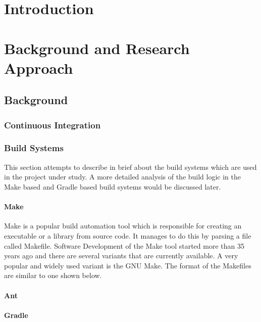 \documentclass[12pt, a4paper, titlepage]{scrartcl}
\begin{document}
\section{Introduction}

\section{Background and Research Approach}

\subsection{Background}
\subsubsection{Continuous Integration}
\subsubsection{Build Systems}
\par This section attempts to describe in brief about the build systems which are used in the project under study. A more detailed analysis of the build logic in the Make based and Gradle based build systems would be discussed later. 
\paragraph{Make}
\par Make is a popular build automation tool which is responsible for creating an executable or a library from source code. It manages to do this by parsing a file called Makefile. Software Development of the Make tool started more than 35 years ago\cite{Feldman1979} and there are several variants that are currently available. A very popular and widely used variant is the GNU Make. The format of the Makefiles are similar to one shown below\cite{GNUMakeManual}. 

\noindent{}



\paragraph{Ant}
\paragraph{Gradle}
\end{document}
